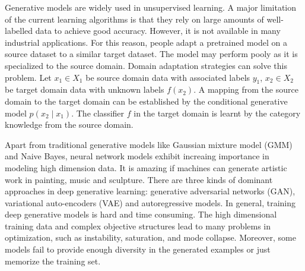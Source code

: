 \documentclass{article}
\begin{document}
Generative models are widely used in unsupervised learning. A major limitation of the current learning algorithms is that they rely on large amounts of well-labelled data to achieve good accuracy. However, it is not available in many industrial applications. For this reason, people adapt a pretrained model on a source dataset to a similar target dataset. The model may perform pooly as it is specialized to the source domain. Domain adaptation strategies can solve this problem. Let $x_1 \in X_1$ be source domain data with associated labels $y_1$, $x_2 \in X_2$ be target domain data with unknown labels $f(x_2)$. A mapping from the source domain to the target domain can be established by the conditional generative model $p(x_2\mid x_1)$. The classifier $f$ in the target domain is learnt by the category knowledge from the source domain.

Apart from traditional generative models like Gaussian mixture model (GMM) and Naive Bayes, neural network models exhibit increaing importance in modeling high dimension data. It is amazing if machines can generate artistic work in painting, music and sculpture. There are three kinds of dominant approaches in deep generative learning: generative adversarial networks (GAN), variational auto-encoders (VAE) and autoregressive models.
In general, training deep generative models is hard and time consuming. The high dimensional training data and complex objective structures lead to many problems in optimization, such as instability, saturation, and mode collapse. Moreover, some models fail to provide enough diversity in the generated examples or just memorize the training set.
\end{document}
